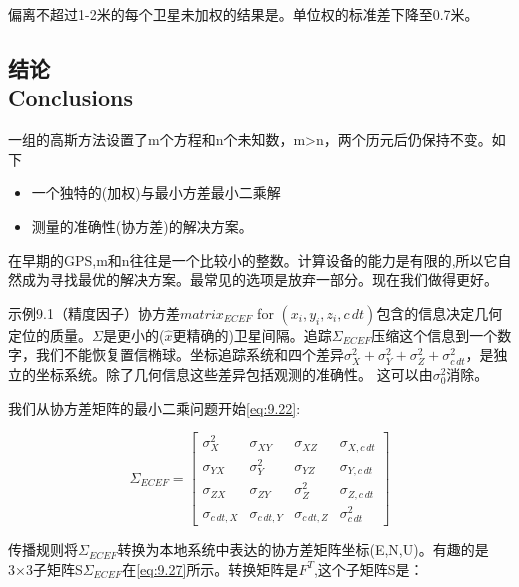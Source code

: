 	偏离不超过1-2米的每个卫星未加权的结果是。单位权的标准差下降至0.7米。
	\subsection[结论]{结论\\Conclusions}

	一组的高斯方法设置了m个方程和n个未知数，m>n，两个历元后仍保持不变。如下

		\begin{itemize}

			\item 一个独特的(加权)与最小方差最小二乘解

			\item 测量的准确性(协方差)的解决方案。

		\end{itemize}

	在早期的GPS,m和n往往是一个比较小的整数。计算设备的能力是有限的,所以它自然成为寻找最优的解决方案。最常见的选项是放弃一部分。现在我们做得更好。

	示例9.1（精度因子）协方差$matrix_{ECEF}$ for $(x_i,y_i,z_i,c\,dt)$包含的信息决定几何定位的质量。$\Sigma$是更小的($\hat{x}$更精确的)卫星间隔。追踪$\Sigma_{ECEF}$压缩这个信息到一个数字，我们不能恢复置信椭球。坐标追踪系统和四个差异$\sigma^2_X+\sigma^2_Y+\sigma^2_Z+\sigma^2_{c\,dt}$，是独立的坐标系统。除了几何信息这些差异包括观测的准确性。
这可以由$\sigma^2_0$消除。
	
	我们从协方差矩阵的最小二乘问题开始\ref{eq:9.22}:

		\begin{equation}\label{eq:9.27}
			\Sigma_{ECEF} = 
			\begin{bmatrix}

				\sigma^2_X & \sigma_{XY} & \sigma_{XZ} & \sigma_{X,c\,dt} \\

				\sigma_{YX}& \sigma^2_Y  & \sigma_{YZ} & \sigma_{Y,c\,dt} \\

				\sigma_{ZX}& \sigma_{ZY} & \sigma^2_Z & \sigma_{Z,c\,dt} \\

				\sigma_{c\,dt,X} & \sigma_{c\,dt,Y} & \sigma_{c\,dt,Z} & \sigma^2_{c\,dt} 

			\end{bmatrix}
		\end{equation}

	传播规则将$\Sigma_{ECEF}$转换为本地系统中表达的协方差矩阵坐标(E,N,U)。有趣的是3×3子矩阵S$\Sigma_{ECEF}$在\ref{eq:9.27}所示。转换矩阵是$F^T$,这个子矩阵S是：

